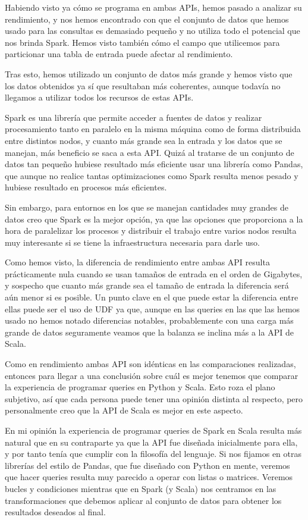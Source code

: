 \documentclass[12pt,twoside,titlepage]{report}
\begin{document}
Habiendo visto ya cómo se programa en ambas APIs, hemos pasado a analizar su rendimiento, y nos hemos encontrado con que el conjunto de datos que hemos usado para las consultas es demasiado pequeño y no utiliza todo el potencial que nos brinda Spark. Hemos visto también cómo el campo que utilicemos para particionar una tabla de entrada puede afectar al rendimiento.

Tras esto, hemos utilizado un conjunto de datos más grande y hemos visto que los datos obtenidos ya sí que resultaban más coherentes, aunque todavía no llegamos a utilizar todos los recursos de estas APIs.

Spark es una librería que permite acceder a fuentes de datos y realizar procesamiento tanto en paralelo en la misma máquina como de forma distribuida entre distintos nodos, y cuanto más grande sea la entrada y los datos que se manejan, más beneficio se saca a esta API. Quizá al tratarse de un conjunto de datos tan pequeño hubiese resultado más eficiente usar una librería como Pandas, que aunque no realice tantas optimizaciones como Spark resulta menos pesado y hubiese resultado en procesos más eficientes.

Sin embargo, para entornos en los que se manejan cantidades muy grandes de datos creo que Spark es la mejor opción, ya que las opciones que proporciona a la hora de paralelizar los procesos y distribuir el trabajo entre varios nodos resulta muy interesante si se tiene la infraestructura necesaria para darle uso.

Como hemos visto, la diferencia de rendimiento entre ambas API resulta prácticamente nula cuando se usan tamaños de entrada en el orden de Gigabytes, y sospecho que cuanto más grande sea el tamaño de entrada la diferencia será aún menor si es posible. Un punto clave en el que puede estar la diferencia entre ellas puede ser el uso de UDF ya que, aunque en las queries en las que las hemos usado no hemos notado diferencias notables, probablemente con una carga más grande de datos seguramente veamos que la balanza se inclina más a la API de Scala.

Como en rendimiento ambas API son idénticas en las comparaciones realizadas, entonces para llegar a una conclusión sobre cuál es mejor tenemos que comparar la experiencia de programar queries en Python y Scala. Esto roza el plano subjetivo, así que cada persona puede tener una opinión distinta al respecto, pero personalmente creo que la API de Scala es mejor en este aspecto.

En mi opinión la experiencia de programar queries de Spark en Scala resulta más natural que en su contraparte ya que la API fue diseñada inicialmente para ella, y por tanto tenía que cumplir con la filosofía del lenguaje. Si nos fijamos en otras librerías del estilo de Pandas, que fue diseñado con Python en mente, veremos que hacer queries resulta muy parecido a operar con listas o matrices. Veremos bucles y condiciones mientras que en Spark (y Scala) nos centramos en las transformaciones que debemos aplicar al conjunto de datos para obtener los resultados deseados al final.
\end{document}
